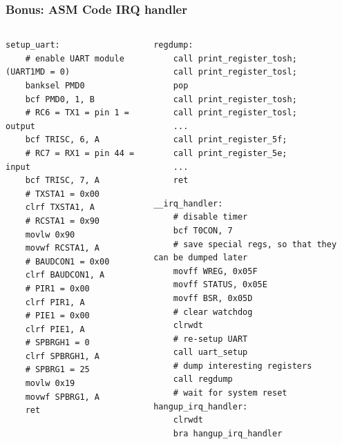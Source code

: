 \documentclass[aspectratio=169]{beamer}
\begin{document}
\begin{frame}[fragile]
	\frametitle{Bonus: ASM Code IRQ handler}

\begin{tiny}
	\begin{columns}
		\begin{column}{0.5\textwidth}
\begin{lstlisting}[frame=single]
setup_uart:
    # enable UART module (UART1MD = 0)
    banksel PMD0
    bcf PMD0, 1, B
    # RC6 = TX1 = pin 1 = output
    bcf TRISC, 6, A
    # RC7 = RX1 = pin 44 = input
    bcf TRISC, 7, A
    # TXSTA1 = 0x00
    clrf TXSTA1, A
    # RCSTA1 = 0x90
    movlw 0x90
    movwf RCSTA1, A
    # BAUDCON1 = 0x00
    clrf BAUDCON1, A
    # PIR1 = 0x00
    clrf PIR1, A
    # PIE1 = 0x00
    clrf PIE1, A
    # SPBRGH1 = 0
    clrf SPBRGH1, A
    # SPBRG1 = 25
    movlw 0x19
    movwf SPBRG1, A
    ret
\end{lstlisting}
		\end{column}
		\begin{column}{0.5\textwidth}
\begin{lstlisting}[frame=single]
regdump:
    call print_register_tosh;
    call print_register_tosl;
    pop
    call print_register_tosh;
    call print_register_tosl;
    ...
    call print_register_5f;
    call print_register_5e;
    ...
    ret
\end{lstlisting}
\begin{lstlisting}[frame=single]
__irq_handler:
    # disable timer
    bcf T0CON, 7
    # save special regs, so that they can be dumped later
    movff WREG, 0x05F
    movff STATUS, 0x05E
    movff BSR, 0x05D
    # clear watchdog
    clrwdt
    # re-setup UART
    call uart_setup
    # dump interesting registers
    call regdump
    # wait for system reset
hangup_irq_handler:
    clrwdt
    bra hangup_irq_handler
\end{lstlisting}
		\end{column}
	\end{columns}
\end{tiny}
\end{frame}
\end{document}
